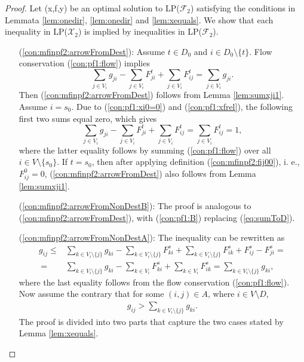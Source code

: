 \begin{proof}
Let (x,f,y) be an optimal solution to LP($\mathcal{F}_2$) satisfying the conditions in Lemmata \ref{lem:onedir}, \ref{lem:onedir} and \ref{lem:xequals}.
We show that each inequality in LP($\mathcal{X}_2$) is implied by inequalities in LP($\mathcal{F}_2$).

\begin{itemize}[leftmargin=1cm]
\item[ (\ref{con:mfinpf2:arrowFromDest}):] Assume $t\in D_0$ and $i\in D_0\setminus\{t\}$. Flow conservation (\ref{con:pf1:flow}) implies
	$$\sum_{j\in V_i}g_{ji} - \sum_{j\in V_i}F^t_{ji} + \sum_{j\in V_i}F^t_{ij} = \sum_{j\in V_i}g_{ji}.$$ Then (\ref{con:mfinpf2:arrowFromDest}) follows from Lemma \ref{lem:sumxji1}.
	Assume $i=s_0$. Due to (\ref{con:pf1:xi0=0}) and (\ref{con:pf1:xfrel}), the following first two sums equal zero, which gives
	$$\sum_{j\in V_i}g_{ji} - \sum_{j\in V_i}F^t_{ji} + \sum_{j\in V_i}F^t_{ij} = \sum_{j\in V_i}F^t_{ij} = 1,$$
	where the latter equality follows by summing (\ref{con:pf1:flow}) over all $i\in V\setminus\{s_0\}$. If $t=s_0$, then after applying definition (\ref{con:mfinpf2:fij00}), i. e., $F^0_{ij}=0$, (\ref{con:mfinpf2:arrowFromDest})  also follows from Lemma \ref{lem:sumxji1}. 
\item[ (\ref{con:mfinpf2:arrowFromNonDestB}):] The proof is analogous to (\ref{con:mfinpf2:arrowFromDest}), with (\ref{con:pf1:B}) replacing (\ref{eq:sumToD}).
\item[ (\ref{con:mfinpf2:arrowFromNonDestA}):] The inequality can be rewritten as
	\begin{align*}
	 g_{ij}  \leq& \sum\limits_{k \in V_i\setminus\{j\}}g_{ki}-\sum\limits_{k \in V_i\setminus\{j\}}F^s_{ki}+\sum\limits_{k \in V_i\setminus\{j\}}F^s_{ik} +F^s_{ij}-F^s_{ji} = \\
	 ~=& \sum\limits_{k \in V_i\setminus\{j\}}g_{ki}-\sum\limits_{k \in V_i}F^s_{ki}+\sum\limits_{k \in V_i}F^s_{ik} = \sum\limits_{k \in V_i\setminus\{j\}}g_{ki},
	\end{align*}
	where the last equality follows from the flow conservation (\ref{con:pf1:flow}). Now assume the contrary that for some $(i,j)\in A$, where $i\in V\setminus D$,
	\begin{align}
	g_{ij} > \sum\limits_{k \in V_i\setminus\{j\}}g_{ki}.\label{eq:assumContr}
	\end{align}
	The proof is divided into two parts that capture the two cases stated by Lemma \ref{lem:xequals}.

\end{itemize}
\end{proof}
